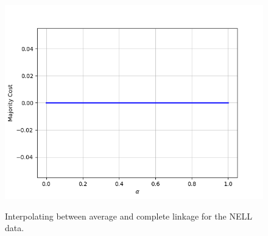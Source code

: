 \begin{figure}[h]
\begin{minipage}{.24\textwidth}
  {\includegraphics[width=\linewidth]{plots/nell-ac/website}}
\end{minipage}
\caption{Interpolating between average and complete linkage for the NELL data.}
\end{figure}

